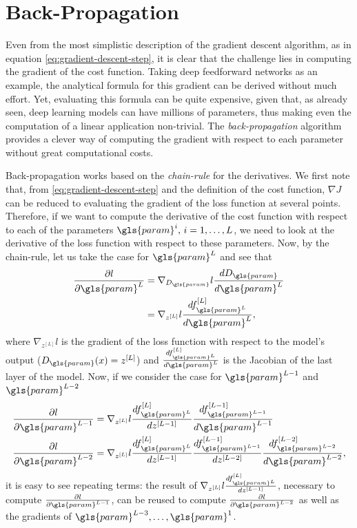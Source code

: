 \section{Back-Propagation}\label{sec:backprop}

Even from the most simplistic description of the gradient descent algorithm, as in equation \eqref{eq:gradient-descent-step}, it is clear that the challenge lies in computing the gradient of the cost function.
Taking deep feedforward networks as an example, the analytical formula for this gradient can be derived without much effort.
Yet, evaluating this formula can be quite expensive, given that, as already seen, deep learning models can have millions of parameters, thus making even the computation of a linear application non-trivial.
The \emph{back-propagation} algorithm \cite{rumelhart_learning_1986} provides a clever way of computing the gradient with respect to each parameter without great computational costs.

Back-propagation works based on the \emph{chain-rule} for the derivatives.
We first note that, from \eqref{eq:gradient-descent-step} and the definition of the cost function, $\nabla J$ can be reduced to evaluating the gradient of the loss function at several points.
Therefore, if we want to compute the derivative of the cost function with respect to each of the parameters $\gls{param}^i,\,i=1,\ldots,L$, we need to look at the derivative of the loss function with respect to these parameters.
Now, by the chain-rule, let us take the case for $\gls{param}^L$ and see that
 \begin{align*}
     \frac{\partial l}{\partial\gls{param}^L} &= \nabla_{D_{\gls{param}}} l \frac{d D_{\gls{param}}}{d \gls{param}^L} \\
     &= \nabla_{z^{[L]}} l \frac{d f^{[L]}_{\gls{param}^L}}{d \gls{param}^L}
,\end{align*}
where $\nabla_{z^{[L]}} l$ is the gradient of the loss function with respect to the model's output ($D_{\gls{param}}(x)=z^{[L]}$) and $\frac{d f^{[L]}_{\gls{param}^L}}{d \gls{param}^L}$ is the Jacobian of the last layer of the model. Now, if we consider the case for $\gls{param}^{L-1}$ and $\gls{param}^{L-2}$
 \begin{align*}
     \frac{\partial l}{\partial\gls{param}^{L-1}} &= \nabla_{z^{[L]}} l \frac{d f^{[L]}_{\gls{param}^L}}{d z^{[L-1]}} \frac{d f^{[L-1]}_{\gls{param}^{L-1}}}{d \gls{param}^{L-1}} \\
     \frac{\partial l}{\partial\gls{param}^{L-2}} &= \nabla_{z^{[L]}} l \frac{d f^{[L]}_{\gls{param}^L}}{d z^{[L-1]}} \frac{d f^{[L-1]}_{\gls{param}^{L-1}}}{d z^{[L-2]}} \frac{d f^{[L-2]}_{\gls{param}^{L-2}}}{d \gls{param}^{L-2}}
,\end{align*}
it is easy to see repeating terms: the result of $\nabla_{z^{[L]}} l \frac{d f^{[L]}_{\gls{param}^L}}{d z^{[L-1]}}$, necessary to compute $\frac{\partial l}{\partial\gls{param}^{L-1}}$, can be reused to compute $\frac{\partial l}{\partial\gls{param}^{L-2}}$ as well as the gradients of $\gls{param}^{L-3},\ldots,\gls{param}^1$.

